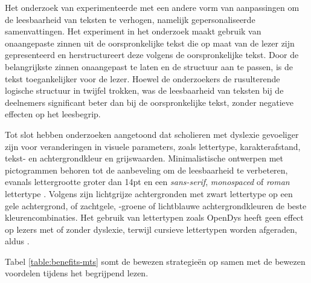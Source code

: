 \medspace

Het onderzoek van \textcite{Nandhini2013} experimenteerde met een andere vorm van aanpassingen om de leesbaarheid van teksten te verhogen, namelijk gepersonaliseerde samenvattingen. Het experiment in het onderzoek maakt gebruik van onaangepaste zinnen uit de oorspronkelijke tekst die op maat van de lezer zijn gepresenteerd en herstructureert deze volgens de oorspronkelijke tekst. Door de belangrijkste zinnen onaangepast te laten en de structuur aan te passen, is de tekst toegankelijker voor de lezer. Hoewel de onderzoekers de rusulterende logische structuur in twijfel trokken, was de leesbaarheid van teksten bij de deelnemers significant beter dan bij de oorspronkelijke tekst, zonder negatieve effecten op het leesbegrip.

\medspace

Tot slot hebben onderzoeken aangetoond dat scholieren met dyslexie gevoeliger zijn voor veranderingen in visuele parameters, zoals lettertype, karakterafstand, tekst- en achtergrondkleur en grijswaarden. Minimalistische ontwerpen met pictogrammen behoren tot de aanbeveling om de leesbaarheid te verbeteren, evanals lettergrootte groter dan 14pt en een \textit{sans-serif}, \textit{monospaced} of \textit{roman} lettertype \autocite{Rello2013b}. Volgens \textcite{Rello2015, Bezem2016, Rello2017} zijn lichtgrijze achtergronden met zwart lettertype op een gele achtergrond, of zachtgele, -groene of lichtblauwe achtergrondkleuren de beste kleurencombinaties. Het gebruik van lettertypen zoals OpenDys heeft geen effect op lezers met of zonder dyslexie, terwijl cursieve lettertypen worden afgeraden, aldus \textcite{Rello2013b, Rello2015}.

\medspace

Tabel \ref{table:benefits-mts} somt de bewezen strategieën op samen met de bewezen voordelen tijdens het begrijpend lezen.

\medspace

